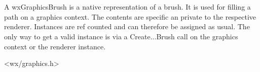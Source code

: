 
\section{}\label{wxgraphicsbrush}



A wxGraphicsBrush is a native representation of a brush. It is used for filling a path on a graphics context. The contents are specific an private to the respective renderer. Instances are ref counted and can therefore be assigned as usual. The only way to get a valid instance is via a Create...Brush call on the graphics context or the renderer instance.


<wx/graphics.h>




